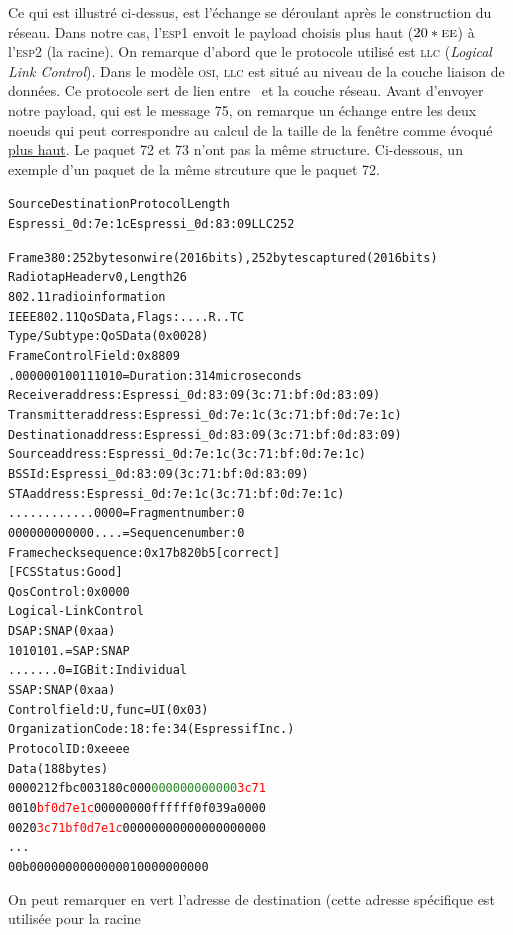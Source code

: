             Ce qui est illustré ci-dessus, est l'échange se déroulant après le construction du réseau.
            Dans notre cas, l'\textsc{esp1} envoit le payload choisis plus haut ($20*\textsc{ee}$)
            à l'\textsc{esp2} (la racine).
            On remarque d'abord que le protocole utilisé est \textsc{llc} (\textit{Logical Link Control}).
            Dans le modèle \textsc{osi}, \textsc{llc} est situé au niveau de la couche liaison de données.
            Ce protocole sert de lien entre \mac\ et la couche réseau.
            Avant d'envoyer notre payload, qui est le message 75, on remarque un échange entre les deux
            noeuds qui peut correspondre au calcul de la taille de la fenêtre comme évoqué \hyperref[compute_windowSize]{plus haut}.
            Le paquet 72 et 73 n'ont pas la même structure. Ci-dessous, un exemple d'un paquet de la même
            strcuture que le paquet 72.
            \begin{alltt}
Source                Destination           Protocol Length
Espressi_0d:7e:1c     Espressi_0d:83:09     LLC      252   
            
Frame 380: 252 bytes on wire (2016 bits), 252 bytes captured (2016 bits)
Radiotap Header v0, Length 26
802.11 radio information
IEEE 802.11 QoS Data, Flags: ....R..TC
    Type/Subtype: QoS Data (0x0028)
    Frame Control Field: 0x8809
    .000 0001 0011 1010 = Duration: 314 microseconds
    Receiver address: Espressi_0d:83:09 (3c:71:bf:0d:83:09)
    Transmitter address: Espressi_0d:7e:1c (3c:71:bf:0d:7e:1c)
    Destination address: Espressi_0d:83:09 (3c:71:bf:0d:83:09)
    Source address: Espressi_0d:7e:1c (3c:71:bf:0d:7e:1c)
    BSS Id: Espressi_0d:83:09 (3c:71:bf:0d:83:09)
    STA address: Espressi_0d:7e:1c (3c:71:bf:0d:7e:1c)
    .... .... .... 0000 = Fragment number: 0
    0000 0000 0000 .... = Sequence number: 0
    Frame check sequence: 0x17b820b5 [correct]
    [FCS Status: Good]
    Qos Control: 0x0000
Logical-Link Control
    DSAP: SNAP (0xaa)
        1010 101. = SAP: SNAP
        .... ...0 = IG Bit: Individual
    SSAP: SNAP (0xaa)
    Control field: U, func=UI (0x03)
    Organization Code: 18:fe:34 (Espressif Inc.)
    Protocol ID: 0xeeee
Data (188 bytes)
0000  21 2f bc 00 31 80 c0 00 \textcolor{ForestGreen}{00 00 00 00 00 00} \textcolor{red}{3c 71}
0010  \textcolor{red}{bf 0d 7e 1c} 00 00 00 00 ff ff ff 0f 03 9a 00 00
0020  \textcolor{red}{3c 71 bf 0d 7e 1c} 00 00 00 00 00 00 00 00 00 00
...
00b0  00 00 00 00 00 00 01 00 00 00 00 00            
            \end{alltt}
            On peut remarquer en vert l'adresse de destination (cette adresse spécifique est utilisée pour la racine
